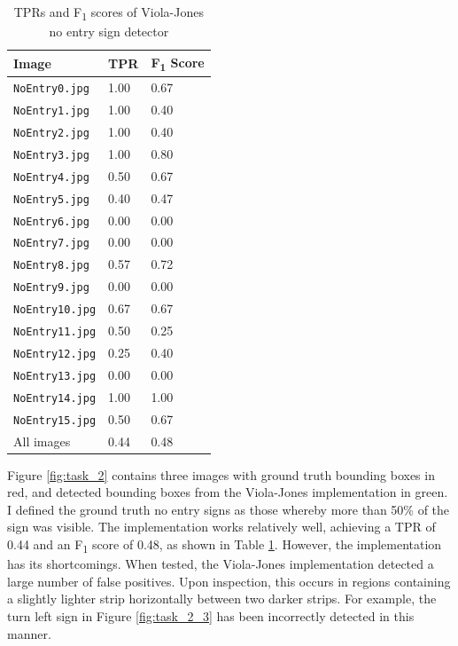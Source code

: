 \documentclass[twocolumn, 10pt, a4paper]{article}
\begin{document}
\begin{table}[htbp]
  \begin{center}
  \caption{TPRs and F\textsubscript{1} scores of Viola-Jones no entry sign detector}\label{tab:vj}
  \begin{tabular}{l | l l} 
    \hline\hline
    Image&TPR&F\textsubscript{1} Score\\
    \hline
    \texttt{NoEntry0.jpg}&1.00&0.67\\ 
    \texttt{NoEntry1.jpg}&1.00&0.40\\ 
    \texttt{NoEntry2.jpg}&1.00&0.40\\ 
    \texttt{NoEntry3.jpg}&1.00&0.80\\ 
    \texttt{NoEntry4.jpg}&0.50&0.67\\ 
    \texttt{NoEntry5.jpg}&0.40&0.47\\ 
    \texttt{NoEntry6.jpg}&0.00&0.00\\ 
    \texttt{NoEntry7.jpg}&0.00&0.00\\
    \texttt{NoEntry8.jpg}&0.57&0.72\\ 
    \texttt{NoEntry9.jpg}&0.00&0.00\\ 
    \texttt{NoEntry10.jpg}&0.67&0.67\\ 
    \texttt{NoEntry11.jpg}&0.50&0.25\\ 
    \texttt{NoEntry12.jpg}&0.25&0.40\\ 
    \texttt{NoEntry13.jpg}&0.00&0.00\\ 
    \texttt{NoEntry14.jpg}&1.00&1.00\\ 
    \texttt{NoEntry15.jpg}&0.50&0.67\\ 
    \hdashline
    All images&0.44&0.48\\ 
    \hline
  \end{tabular}
  \end{center}
\end{table} 

Figure \ref{fig:task_2} contains three images with ground truth bounding boxes in red, and detected bounding boxes from the Viola-Jones implementation in green.
I defined the ground truth no entry signs as those whereby more than 50\% of the sign was visible.
The implementation works relatively well, achieving a TPR of 0.44 and an F\textsubscript{1} score of 0.48, as shown in Table \ref{tab:vj}.
However, the implementation has its shortcomings.
When tested, the Viola-Jones implementation detected a large number of false positives.
Upon inspection, this occurs in regions containing a slightly lighter strip horizontally between two darker strips.
For example, the turn left sign in Figure \ref{fig:task_2_3} has been incorrectly detected in this manner.
\end{document}
